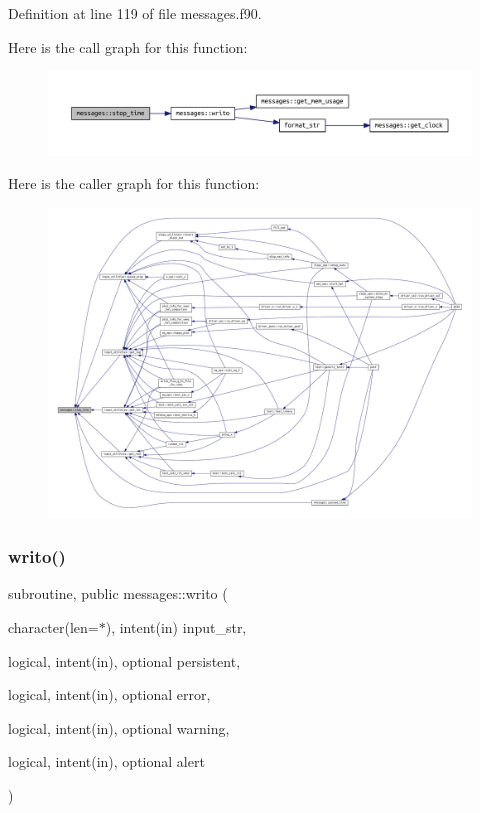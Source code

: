 Definition at line 119 of file messages.\+f90.

Here is the call graph for this function\+:
\nopagebreak
\begin{figure}[H]
\begin{center}
\leavevmode
\includegraphics[width=350pt]{namespacemessages_a2a1154de25763d4894275ff4307b6862_cgraph}
\end{center}
\end{figure}
Here is the caller graph for this function\+:
\nopagebreak
\begin{figure}[H]
\begin{center}
\leavevmode
\includegraphics[width=350pt]{namespacemessages_a2a1154de25763d4894275ff4307b6862_icgraph}
\end{center}
\end{figure}
\mbox{\label{namespacemessages_aa4a8d01563e92558e8a0875b075ec54c}} 
\subsubsection{\texorpdfstring{writo()}{writo()}}
{\footnotesize\ttfamily subroutine, public messages\+::writo (\begin{DoxyParamCaption}\item[{character(len=$\ast$), intent(in)}]{input\+\_\+str,  }\item[{logical, intent(in), optional}]{persistent,  }\item[{logical, intent(in), optional}]{error,  }\item[{logical, intent(in), optional}]{warning,  }\item[{logical, intent(in), optional}]{alert }\end{DoxyParamCaption})}



